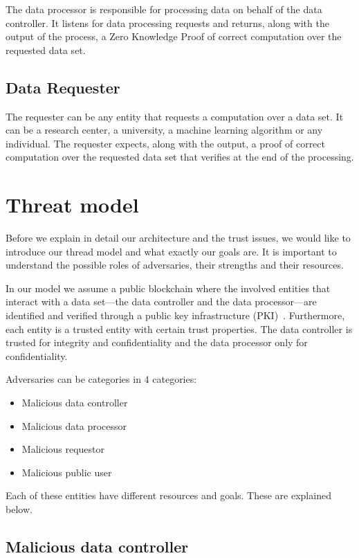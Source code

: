 The data processor is responsible for processing data on behalf of the data controller. It listens for data processing requests and returns, along with the output of the process, a Zero Knowledge Proof of correct computation over the requested data set.

\subsection{Data Requester}
\label{solution:entities:data_req}

The requester can be any entity that requests a computation over a data set. It can be a research center, a university, a machine learning algorithm or any individual. The requester expects, along with the output, a proof of correct computation over the requested data set that verifies at the end of the processing.

\section{Threat model}
\label{solution:treat_model}

Before we explain in detail our architecture and the trust issues, we would like to introduce our thread model and what exactly our goals are. It is important to understand the possible roles of adversaries, their strengths and their resources.

In our model we assume a public blockchain where the involved entities that interact with a data set---the data controller and the data processor---are identified and verified through a public key infrastructure (PKI)~\cite{adams_understanding_2003}. Furthermore, each entity is a trusted entity with certain trust properties. Τhe data controller is trusted for integrity and confidentiality and the data processor only for confidentiality.

Adversaries can be categories in 4 categories:

\begin{itemize}
  \item Malicious data controller
  \item Malicious data processor
  \item Malicious requestor
  \item Malicious public user
\end{itemize}

Each of these entities have different resources and goals. These are explained below.

\subsection{Malicious data controller}
\label{solution:treat_model:mcontroller}

